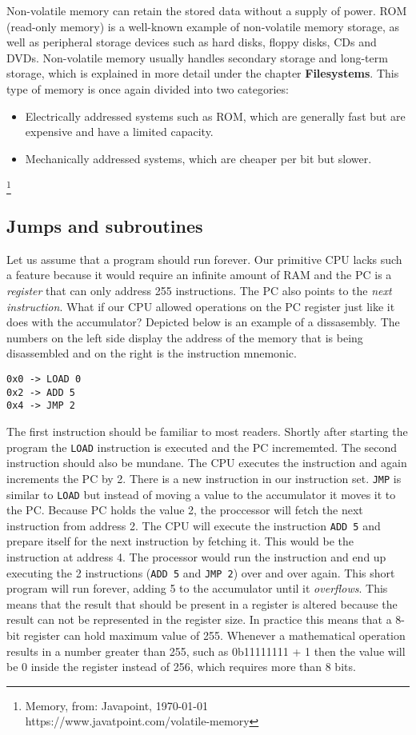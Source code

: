 Non-volatile memory can retain the stored data without a supply of power. ROM (read-only memory) is a well-known
example of non-volatile memory storage, as well as peripheral storage devices such as hard disks, floppy disks, CDs and 
DVDs. Non-volatile memory usually handles secondary storage and long-term storage, which is explained in more detail
under the chapter \textbf{Filesystems}. This type of memory is once again
divided into two categories:
\begin{itemize}
\item Electrically addressed systems such as ROM, which are generally fast but are expensive and
have a limited capacity. 
\item Mechanically addressed systems, which are cheaper per bit but slower. 
\end{itemize}

\footnote{Memory, from: Javapoint, \today \\ https://www.javatpoint.com/volatile-memory}


\subsection{Jumps and subroutines}

Let us assume that a program should run forever. Our primitive CPU lacks such a feature because it
would require an infinite amount of RAM and the PC is a \textit{register} that can only address 255 
instructions. The PC also points to the \textit{next instruction}. What if our CPU allowed operations on
the PC register just like it does with the accumulator? Depicted below is an example of a 
dissasembly. The numbers on the left side display the address of the memory that is being
disassembled and on the right is the instruction mnemonic.
\begin{lstlisting}
0x0 -> LOAD 0
0x2 -> ADD 5
0x4 -> JMP 2
\end{lstlisting}
The first instruction should be familiar to most readers. Shortly after starting the program the 
\texttt{LOAD} instruction is executed and the PC incrememted. The second instruction should also be mundane.
The CPU executes the instruction and again increments the PC by 2. There is a new instruction in our 
instruction set. \texttt{JMP} is similar to \texttt{LOAD} but instead of
moving a value to the accumulator it moves it to the PC. Because PC holds the value 2, the
proccessor will fetch the next instruction from address 2. The CPU will execute the instruction
\texttt{ADD 5} and prepare itself for the next instruction by fetching it. This would be the instruction
at address 4. The processor would run the instruction and end up executing the 2 instructions
(\texttt{ADD 5} and \texttt{JMP 2}) over and over again. This short program will run forever, adding 5 to the
accumulator until it \textit{overflows}. This means that the result that should be present in a register
is altered because the result can not be represented in the register size. In practice this means
that a 8-bit register can hold maximum value of 255. Whenever a mathematical operation results in a 
number greater than 255, such as 0b11111111 + 1 then the value will be 0 inside the register instead
of 256, which requires more than 8 bits.

